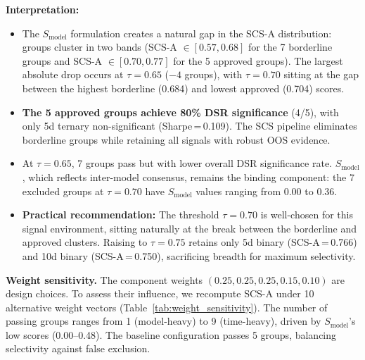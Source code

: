 \documentclass[12pt,a4paper]{article}
\begin{document}
\textbf{Interpretation:}

\begin{itemize}
  \item The $S_{\text{model}}$ formulation creates a natural gap in the SCS-A distribution: groups cluster in two bands (SCS-A $\in [0.57, 0.68]$ for the 7 borderline groups and SCS-A $\in [0.70, 0.77]$ for the 5 approved groups). The largest absolute drop occurs at $\tau=0.65$ ($-4$ groups), with $\tau=0.70$ sitting at the gap between the highest borderline (0.684) and lowest approved (0.704) scores.

  \item \textbf{The 5 approved groups achieve 80\% DSR significance} (4/5), with only 5d ternary non-significant (Sharpe\,=\,0.109). The SCS pipeline eliminates borderline groups while retaining all signals with robust OOS evidence.

  \item At $\tau=0.65$, 7 groups pass but with lower overall DSR significance rate. $S_{\text{model}}$, which reflects inter-model consensus, remains the binding component: the 7 excluded groups at $\tau=0.70$ have $S_{\text{model}}$ values ranging from 0.00 to 0.36.

  \item \textbf{Practical recommendation:} The threshold $\tau=0.70$ is well-chosen for this signal environment, sitting naturally at the break between the borderline and approved clusters. Raising to $\tau=0.75$ retains only 5d binary (SCS-A\,=\,0.766) and 10d binary (SCS-A\,=\,0.750), sacrificing breadth for maximum selectivity.
\end{itemize}

\textbf{Weight sensitivity.} The component weights $(0.25, 0.25, 0.25, 0.15, 0.10)$ are design choices. To assess their influence, we recompute SCS-A under 10 alternative weight vectors (Table~\ref{tab:weight_sensitivity}). The number of passing groups ranges from 1 (model-heavy) to 9 (time-heavy), driven by $S_{\text{model}}$'s low scores (0.00--0.48). The baseline configuration passes 5 groups, balancing selectivity against false exclusion.
\end{document}
